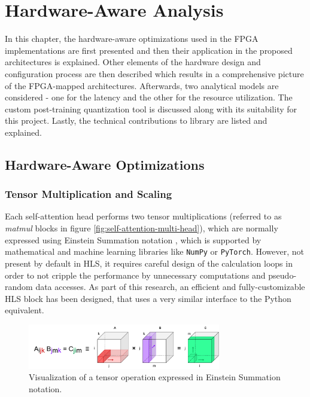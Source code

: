 \chapter{Hardware-Aware Analysis}\label{quantization}
In this chapter, the hardware-aware optimizations used in the FPGA implementations are first presented and then their application in the proposed architectures is explained. Other elements of the hardware design and configuration process are then described which results in a comprehensive picture of the FPGA-mapped architectures. Afterwards, two analytical models are considered - one for the latency and the other for the resource utilization. The custom post-training quantization tool is discussed along with its suitability for this project.
Lastly, the technical contributions to \hlsml library are listed and explained.

\section{Hardware-Aware Optimizations}

\subsection{Tensor Multiplication and Scaling}\label{tensor-multiplication}
Each self-attention head performs two tensor multiplications (referred to as \textit{matmul} blocks in figure \ref{fig:self-attention-multi-head}), which are normally expressed using Einstein Summation notation \cite{59-barr1991einstein}, which is supported by mathematical and machine learning libraries like \texttt{NumPy} or \texttt{PyTorch}. However, not present by default in HLS, it requires careful design of the calculation loops in order to not cripple the performance by unnecessary computations and pseudo-random data accesses. As part of this research, an efficient and fully-customizable HLS block has been designed, that uses a very similar interface to the Python equivalent.

\begin{figure}[hpt!]
  \centering
  \includegraphics[trim={0cm 0cm 0cm 0cm}, width=0.75\textwidth, center]{models/einsum.pdf}
  \caption{Visualization of a tensor operation expressed in Einstein Summation notation.}
  \label{fig:einsum}
\end{figure}

